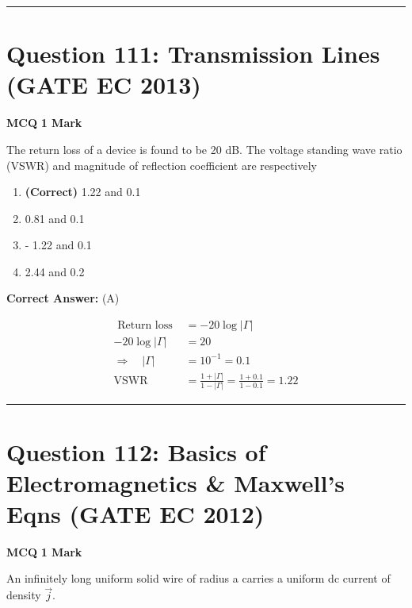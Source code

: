 \documentclass[11pt,a4paper]{article}
\begin{document}
\vspace{1.5em}
\hrule
\vspace{1.5em}

\section*{Question 111: Transmission Lines (GATE EC 2013)}
\noindent \textbf{\color{primary}MCQ} \hfill \textbf{\color{secondary}1 Mark}


\noindent The return loss of a device is found to be 20 dB. The voltage standing wave ratio (VSWR) and magnitude of reflection coefficient are respectively


\begin{enumerate}[label=(\Alph*)]
    \item \textbf{(Correct)} 1.22 and 0.1
    \item 0.81 and 0.1
    \item - 1.22 and 0.1
    \item 2.44 and 0.2
\end{enumerate}

\noindent \textbf{Correct Answer:} (A)

\begin{tcolorbox}[solbox, title=Detailed Solution -- Question 111]
\[
\begin{aligned} \text { Return loss }&=-20 \log |\Gamma| \\ -20 \log |\Gamma|&=20 \\ \Rightarrow \quad|\Gamma|&=10^{-1}=0.1 \\ \text{VSWR}&=\frac{1+|\Gamma|}{1-|\Gamma|}=\frac{1+0.1}{1-0.1}=1.22 \end{aligned}
\]
\end{tcolorbox}

\vspace{1.5em}
\hrule
\vspace{1.5em}

\section*{Question 112: Basics of Electromagnetics \& Maxwell's Eqns (GATE EC 2012)}
\noindent \textbf{\color{primary}MCQ} \hfill \textbf{\color{secondary}1 Mark}


\noindent An infinitely long uniform solid wire of radius a carries a uniform dc current of density $\overrightarrow{j}$. 
\end{document}
